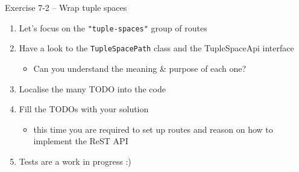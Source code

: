 \documentclass[presentation]{beamer}\mode<presentation>{\usetheme{AMSCesenaPurpleAndGold}}
\begin{document}
\begin{frame}{Exercise 7-2 -- Wrap tuple spaces}
    \begin{enumerate}
        \item Let's focus on the \texttt{"tuple-spaces"} group of routes
        
        \vfill
        
        \item Have a look to the \texttt{TupleSpacePath} class and the \alert{TupleSpaceApi} interface
        \begin{itemize}
            \item Can you understand the meaning \& purpose of each one?
        \end{itemize}
        
        \vfill
        
        \item Localise the many TODO into the code
        
        \vfill
        
        \item Fill the TODOs with your solution
        \begin{itemize}
            \item this time you are required to set up routes and reason on how to implement the ReST API
        \end{itemize}
        
        \vfill
        
        \item Tests are a work in progress :)
        
    \end{enumerate}
\end{frame}

\section*{}

\frame{\titlepage}
\end{document}
